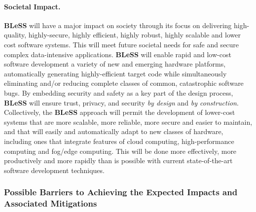 \documentclass[a4paper,11pt]{article}
\newcommand{\project}[1]{\textbf{#1}\xspace}
\newcommand{\BLESS}{\project{BLeSS}}
\newcommand{\TheProject}{\BLESS}
\begin{document}
\paragraph*{Societal Impact.}
\noindent
\TheProject{} will have a major impact on society through its focus on delivering high-quality, highly-secure, highly efficient, highly robust,
highly scalable and lower cost software systems.
This will meet future societal needs for safe and secure complex data-intensive applications.
\TheProject will enable  rapid and low-cost software development a variety of new and emerging hardware platforms, 
automatically generating highly-efficient target code while simultaneously eliminating and/or reducing complete classes of common, catastrophic software bugs.
By embedding security and safety as a key part of the design process, \TheProject{} will ensure trust, privacy, and security
\emph{by design} and \emph{by construction}.
Collectively, the \TheProject{} approach will permit the development of lower-cost systems that are more scalable, more reliable, more secure and easier to maintain,
and that will easily and automatically adapt to new classes of hardware, including ones that integrate features of cloud computing, high-performance computing
and fog/edge computing.  This will be done more effectively, more productively and more rapidly than is possible with current state-of-the-art software
development techniques.

\subsubsection*{Possible Barriers to Achieving the Expected Impacts and Associated Mitigations}

\end{document}
